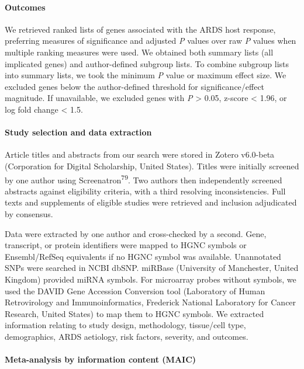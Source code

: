 \documentclass[
  11,
  a4paper,
]{article}
\let\oldparagraph\paragraph
\renewcommand{\paragraph}[1]{\oldparagraph{#1}\mbox{}}
\begin{document}
\hypertarget{outcomes}{%
\paragraph{Outcomes}\label{outcomes}}

We retrieved ranked lists of genes associated with the ARDS host
response, preferring measures of significance and adjusted \emph{P}
values over raw \emph{P} values when multiple ranking measures were
used. We obtained both summary lists (all implicated genes) and
author-defined subgroup lists. To combine subgroup lists into summary
lists, we took the minimum \emph{P} value or maximum effect size. We
excluded genes below the author-defined threshold for
significance/effect magnitude. If unavailable, we excluded genes with
\emph{P} \textgreater{} 0.05, z-score \textless{} 1.96, or log fold
change \textless{} 1.5.

\hypertarget{study-selection-and-data-extraction}{%
\paragraph{Study selection and data
extraction}\label{study-selection-and-data-extraction}}

Article titles and abstracts from our search were stored in Zotero
v6.0-beta (Corporation for Digital Scholarship, United States). Titles
were initially screened by one author using
Screenatron\textsuperscript{79}. Two authors then independently screened
abstracts against eligibility criteria, with a third resolving
inconsistencies. Full texts and supplements of eligible studies were
retrieved and inclusion adjudicated by consensus.

Data were extracted by one author and cross-checked by a second. Gene,
transcript, or protein identifiers were mapped to HGNC symbols or
Ensembl/RefSeq equivalents if no HGNC symbol was available. Unannotated
SNPs were searched in NCBI dbSNP. miRBase (University of Manchester,
United Kingdom) provided miRNA symbols. For microarray probes without
symbols, we used the DAVID Gene Accession Conversion tool (Laboratory of
Human Retrovirology and Immunoinformatics, Frederick National Laboratory
for Cancer Research, United States) to map them to HGNC symbols. We
extracted information relating to study design, methodology, tissue/cell
type, demographics, ARDS aetiology, risk factors, severity, and
outcomes.

\hypertarget{meta-analysis-by-information-content-maic-1}{%
\paragraph{Meta-analysis by information content
(MAIC)}\label{meta-analysis-by-information-content-maic-1}}
\end{document}
